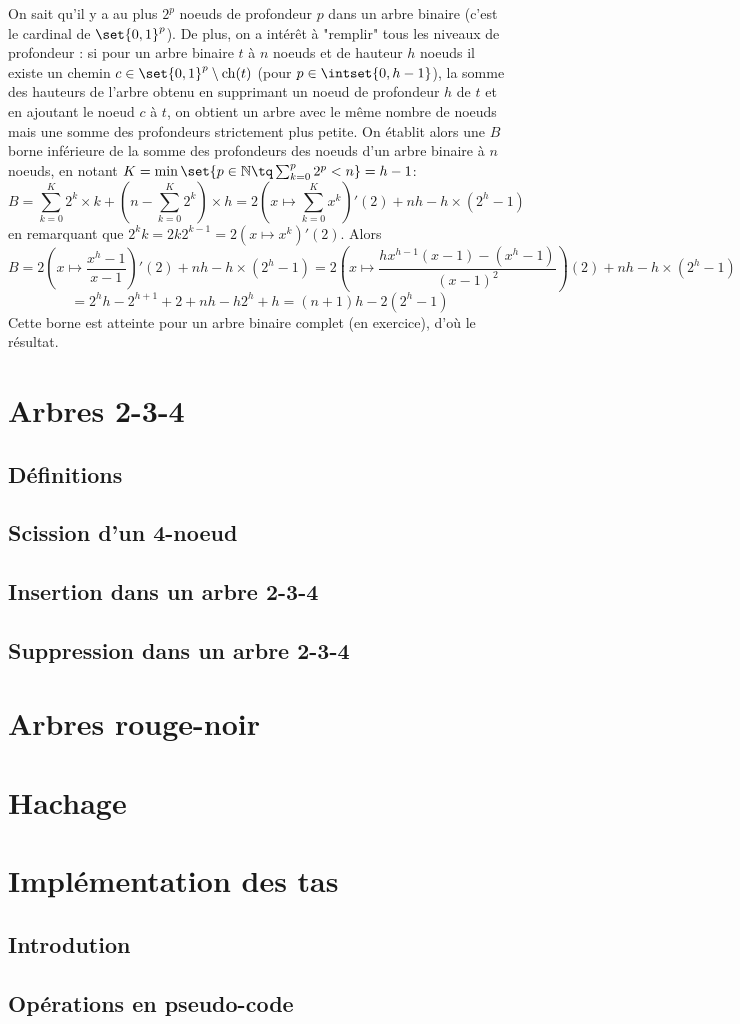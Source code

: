 \documentclass{scrartcl}
\begin{document}
			\begin{demo}
				\item On sait qu'il y a au plus $2^p$ noeuds de profondeur $p$ dans un arbre binaire (c'est le cardinal de $\set{0,1}^p$).
					De plus, on a intérêt à "remplir" tous les niveaux de profondeur : si pour un arbre binaire $t$ à $n$ noeuds et de hauteur $h$ noeuds il existe un chemin $c \in \set{0,1}^p\setminus\mathrm{ch}(t)$ (pour $p \in \intset{0,h-1}$), la somme des hauteurs de l'arbre obtenu en supprimant un noeud de profondeur $h$ de $t$ et en ajoutant le noeud $c$ à $t$, on obtient un arbre avec le même nombre de noeuds mais une somme des profondeurs strictement plus petite.
					On établit alors une $B$ borne inférieure de la somme des profondeurs des noeuds d'un arbre binaire à $n$ noeuds, en notant $K = \min\set{p \in \mathbb{N} \tq \sum_{k=0}^p 2^p < n} = h-1$: 
				\[
					B = \sum_{k=0}^K 2^k\times k + (n-\sum_{k=0}^K 2^k)\times h = 2\left(x\mapsto \sum_{k=0}^K x^k\right)'(2) + nh - h\times(2^h - 1)
				\]
				en remarquant que $2^kk = 2 k 2^{k-1} = 2\left(x \mapsto x^k\right)'(2)$. Alors
				\[
					B = 2\left(x\mapsto \frac{x^h-1}{x-1} \right)'(2) + nh - h\times(2^h - 1) = 2\left(x\mapsto\frac{hx^{h-1}(x-1) - (x^h-1)}{(x-1)^2}\right)(2) + nh - h\times(2^h - 1)
				\]
				\[
					= 2^hh-2^{h+1}+2 + nh - h2^h + h = (n+1)h - 2(2^h-1)
				\]
				Cette borne est atteinte pour un arbre binaire complet (en exercice), d'où le résultat.
			\end{demo}
	\section{Arbres 2-3-4}
		\subsection{Définitions}
		\subsection{Scission d'un 4-noeud}
		\subsection{Insertion dans un arbre 2-3-4}
		\subsection{Suppression dans un arbre 2-3-4}
	\section{Arbres rouge-noir}
	\section{Hachage}
	\section{Implémentation des tas}
		\subsection{Introdution}
		\subsection{Opérations en pseudo-code}
\end{document}
